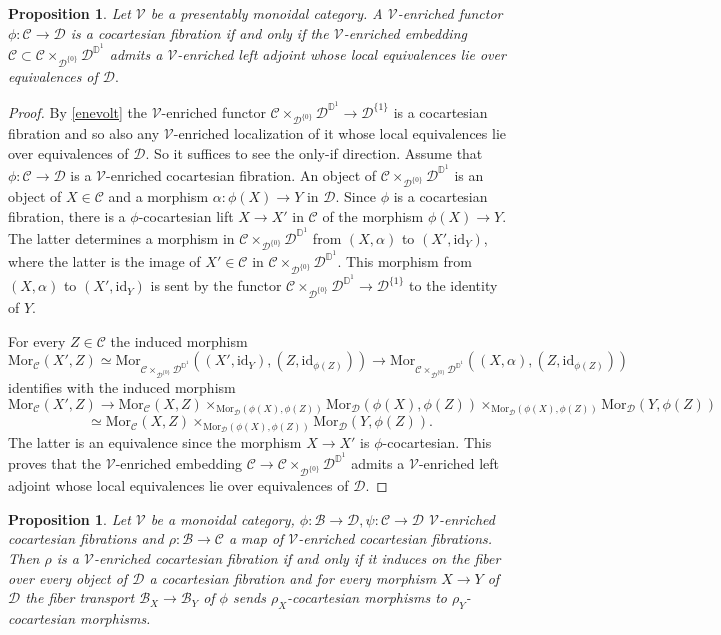 \documentclass[10pt,oneside]{article}
\numberwithin{equation}{section} %
\numberwithin{figure}{section} %
\theoremstyle{plain}
\newtheorem{proposition}[theorem]{Proposition}
\theoremstyle{definition}
\newcommand{\bD}{{\mathbb D}}
\newcommand{\mB}{{\mathcal B}}
\newcommand{\mC}{{\mathcal C}}
\newcommand{\mD}{{\mathcal D}}
\newcommand{\mV}{{\mathcal V}}
\newcommand{\id}{\mathrm{id}}
\newcommand{\Mor}{{\mathrm{Mor}}}
\begin{document}
\begin{proposition}
Let $\mV$ be a presentably monoidal category.
A $\mV$-enriched functor $\phi: \mC \to \mD$ is a cocartesian fibration if and only if the $\mV$-enriched embedding
$\mC \subset \mC \times_{\mD^{\{0\}}} \mD^{\bD^1}$ admits a $\mV$-enriched left adjoint whose local equivalences lie over equivalences of $\mD.$
    
\end{proposition}

\begin{proof}
By \cref{enevolt} the $\mV$-enriched functor $\mC \times_{\mD^{\{0\}}} \mD^{\bD^1} \to \mD^{\{1\}}$ is a cocartesian fibration and so also any $\mV$-enriched localization of it whose local equivalences lie over equivalences of $\mD.$
So it suffices to see the only-if direction.
Assume that $\phi: \mC \to \mD$ is a $\mV$-enriched cocartesian fibration. An object of $\mC \times_{\mD^{\{0\}}} \mD^{\bD^1}$ is an object of $X \in \mC$ and a morphism $\alpha: \phi(X) \to Y$ in $\mD$.
Since $\phi$ is a cocartesian fibration, there is a $\phi$-cocartesian lift $X \to X'$ in $\mC$ of the morphism $\phi(X) \to Y.$
The latter determines a morphism in $ \mC \times_{\mD^{\{0\}}} \mD^{\bD^1} $ from $(X, \alpha)$ to
$(X', \id_Y)$, where the latter is the image of $X'\in \mC$ in  
$\mC \times_{\mD^{\{0\}}} \mD^{\bD^1}$.
This morphism from $(X, \alpha)$ to
$(X', \id_Y)$ is sent by the functor $ \mC \times_{\mD^{\{0\}}} \mD^{\bD^1} \to \mD^{\{1\}}$ to the identity of $Y.$

For every $ Z\in \mC $ the induced morphism
$$ \Mor_\mC(X',Z) \simeq \Mor_{\mC \times_{\mD^{\{0\}}} \mD^{\bD^1}}((X', \id_Y),(Z,\id_{\phi(Z)})) \to \Mor_{\mC \times_{\mD^{\{0\}}} \mD^{\bD^1}}((X, \alpha),(Z,\id_{\phi(Z)})) $$
identifies with the induced morphism
$$ \Mor_\mC(X',Z) \to \Mor_{\mC}(X,Z) \times_{\Mor_{\mD}(\phi(X),\phi(Z))} \Mor_{\mD}(\phi(X),\phi(Z)) \times_{\Mor_{\mD}(\phi(X),\phi(Z))} \Mor_{\mD}(Y,\phi(Z)) $$$$ \simeq 
\Mor_{\mC}(X,Z) \times_{\Mor_{\mD}(\phi(X),\phi(Z))} \Mor_{\mD}(Y,\phi(Z)).$$
The latter is an equivalence since the morphism $X \to X'$ is $\phi$-cocartesian.
This proves that the $\mV$-enriched embedding
$\mC \to \mC \times_{\mD^{\{0\}}} \mD^{\bD^1}$ admits a $\mV$-enriched left adjoint whose local equivalences lie over equivalences of $\mD.$
\end{proof}

\begin{proposition}\label{fibcocart}
Let $\mV$ be a monoidal category, $\phi: \mB \to \mD, \psi: \mC \to \mD$ $\mV$-enriched cocartesian fibrations and 
$\rho: \mB \to \mC$ a map of $\mV$-enriched cocartesian fibrations.
Then $\rho$ is a $\mV$-enriched cocartesian fibration if and only if it induces on the fiber over every object of $\mD$ a cocartesian fibration and for every morphism $ X \to Y$ of $\mD$ the fiber transport $\mB_X \to \mB_Y $ of $\phi$ sends $\rho_X$-cocartesian morphisms to $\rho_Y$-cocartesian morphisms.
    
\end{proposition}
\end{document}
